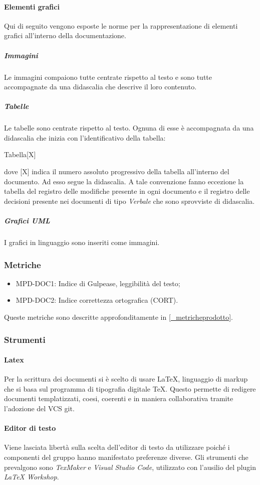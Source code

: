 \paragraph{Elementi grafici}
Qui di seguito vengono esposte le norme per la rappresentazione di elementi grafici all'interno della documentazione.
\subparagraph{Immagini}
Le immagini compaiono tutte centrate rispetto al testo e sono tutte accompagnate da una didascalia che descrive il loro contenuto.
\subparagraph{Tabelle}
Le tabelle sono centrate rispetto al testo. Ognuna di esse è accompagnata da una didascalia che inizia con l'identificativo della tabella:
\begin{center}
    Tabella[X]
\end{center}
dove [X] indica il numero assoluto progressivo della tabella all'interno del documento. Ad esso segue la  didascalia.  A tale convenzione fanno eccezione la tabella del registro delle modifiche presente in ogni documento e il registro delle decisioni presente nei documenti di tipo \textit{Verbale} che sono sprovviste di didascalia.
\subparagraph{Grafici UML}
I grafici in linguaggio  sono inseriti come immagini.

\subsubsection{Metriche}
\begin{itemize}
    \item MPD-DOC1: Indice di Gulpease, leggibilità del testo;
    \item MPD-DOC2: Indice correttezza ortografica (CORT).
\end{itemize}
Queste metriche sono descritte approfonditamente in \ref{_metricheprodotto}.

\subsubsection{Strumenti}
\paragraph{Latex}
Per la scrittura dei documenti si è scelto di usare \LaTeX, linguaggio di markup che si basa sul programma di tipografia digitale \TeX . Questo permette di redigere documenti templatizzati, coesi, coerenti e in maniera collaborativa tramite l'adozione del VCS git.
\paragraph{Editor di testo}
Viene lasciata libertà sulla scelta dell'editor di testo da utilizzare poiché i componenti del gruppo hanno manifestato preferenze diverse. Gli strumenti che prevalgono sono \textit{TexMaker} e \textit{Visual Studio Code}, utilizzato con l'ausilio del plugin \textit{LaTeX Workshop}.
